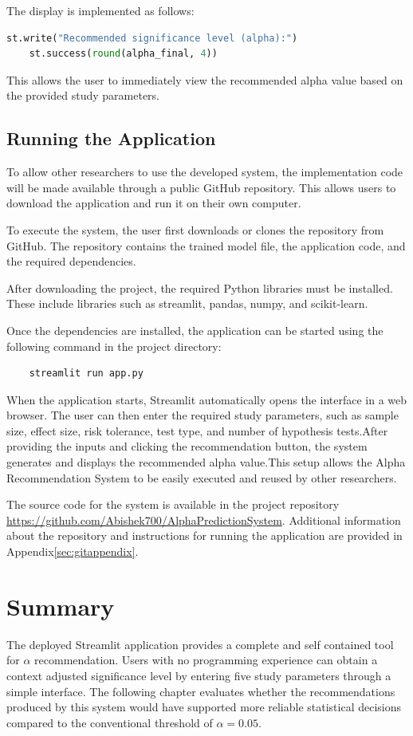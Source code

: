 The display is implemented as follows:

\begin{lstlisting}[language=Python]
	st.write("Recommended significance level (alpha):")
	st.success(round(alpha_final, 4))
\end{lstlisting}

This allows the user to immediately view the recommended alpha value based on the provided study parameters.

\subsection{Running the Application}

To allow other researchers to use the developed system, the implementation code will be made available through a public GitHub repository. This allows users to download the application and run it on their own computer.

To execute the system, the user first downloads or clones the repository from GitHub. The repository contains the trained model file, the application code, and the required dependencies.

After downloading the project, the required Python libraries must be installed. These include libraries such as streamlit, pandas, numpy, and scikit-learn.

Once the dependencies are installed, the application can be started using the following command in the project directory:

\begin{verbatim}
	streamlit run app.py
\end{verbatim}

When the application starts, Streamlit automatically opens the interface in a web browser. The user can then enter the required study parameters, such as sample size, effect size, risk tolerance, test type, and number of hypothesis tests.After providing the inputs and clicking the recommendation button, the system generates and displays the recommended alpha value.This setup allows the Alpha Recommendation System to be easily executed and reused by other researchers.

The source code for the system is available in the project repository \url{https://github.com/Abishek700/AlphaPredictionSystem}. Additional information about the repository and instructions for running
the application are provided in Appendix\ref{sec:gitappendix}.

\section{Summary}

The deployed Streamlit application provides a complete and 
self contained tool for $\alpha$ recommendation. Users with no 
programming experience can obtain a context adjusted significance 
level by entering five study parameters through a simple 
interface. The following chapter evaluates whether the 
recommendations produced by this system would have supported 
more reliable statistical decisions compared to the conventional 
threshold of $\alpha = 0.05$.